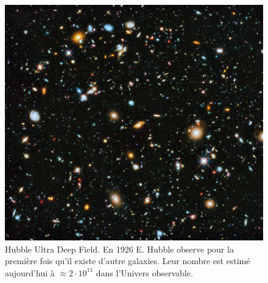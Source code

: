 
\begin{figure}
        \includegraphics[width=.9\linewidth]{img/01/hudf.jpeg} 
        \caption[Hubble Ultra Deep Field]{Hubble Ultra Deep Field.
		En 1926 E. Hubble observe pour la première fois qu'il existe d'autre galaxies.
		Leur nombre est estimé aujourd'hui à $\approx 2 \cdot 10^{11}$ dans l'Univers observable.
 		\label{fig:hubbl_deep_field}}
\end{figure}


